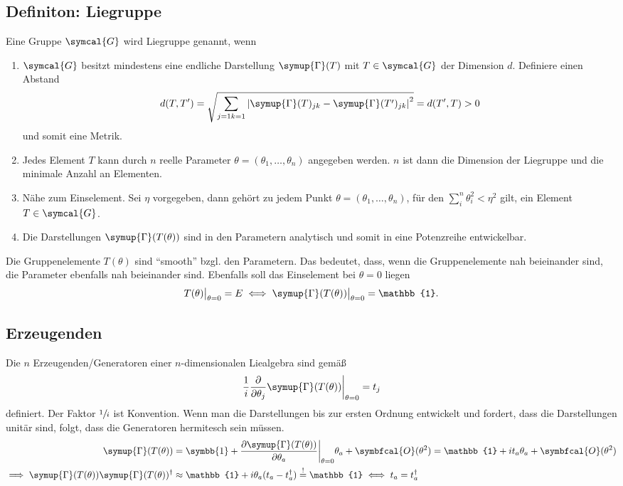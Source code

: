 \documentclass[
  captions=tableheading,  %
  titlepage=firstiscover, %
]{scrartcl}
\begin{document}
\subsection{Definiton: Liegruppe}
Eine Gruppe $\symcal{G}$ wird Liegruppe genannt, wenn
\begin{enumerate}
  \item $\symcal{G}$ besitzt mindestens eine endliche Darstellung $\symup{\Gamma}(T)$ mit $T \in \symcal{G}$ der Dimension 
  $d$. 
  Definiere einen Abstand 
    \begin{equation*}
      d(T,T') = \sqrt{\sum_{\substack{j=1}{k=1}} \left | \symup{\Gamma}(T)_{jk} - \symup{\Gamma}(T')_{jk} \right |^2  } = d(T',T) > 0
    \end{equation*}
    und somit eine Metrik.
  \item Jedes Element $T$ kann durch $n$ reelle Parameter $\theta = (\theta_1, \ldots, \theta_n)$ angegeben werden.
    $n$ ist dann die Dimension der Liegruppe und die minimale Anzahl an Elementen.
  \item Nähe zum Einselement. Sei $\eta$ vorgegeben, dann gehört zu jedem Punkt $\theta =  (\theta_1, \ldots, \theta_n)$,
    für den $\sum_i^n \theta_i^2 < \eta^2$ gilt, ein Element $T \in \symcal{G}$.
  \item Die Darstellungen $\symup{\Gamma}(T(\theta))$ sind in den Parametern analytisch und somit in eine Potenzreihe entwickelbar.
\end{enumerate}
Die Gruppenelemente $T(\theta)$ sind \enquote{smooth} bzgl. den Parametern. 
Das bedeutet, dass, wenn die Gruppenelemente nah beieinander sind, die Parameter ebenfalls nah beieinander sind.
Ebenfalls soll das Einselement bei $\theta = 0$ liegen
\begin{equation*}
  T(\theta)\big |_{\theta = 0} = E \iff \symup{\Gamma}(T(\theta)) \big |_{\theta = 0} = \mathbb{1} .
\end{equation*}
\subsection{Erzeugenden}
Die $n$ Erzeugenden/Generatoren einer $n$-dimensionalen Liealgebra sind gemäß 
\begin{equation}
  \frac{1}{i} \frac{\partial}{\partial \theta_j} \symup{\Gamma}(T(\theta)) \biggr |_{\theta = 0} = t_j \label{eqn:gen}
\end{equation}
definiert. 
Der Faktor $\sfrac{1}{i}$ ist Konvention.
Wenn man die Darstellungen bis zur ersten Ordnung entwickelt und fordert, dass die Darstellungen 
unitär sind, folgt, dass die Generatoren hermitesch sein müssen. 
\begin{align*}
  \symup{\Gamma}(T(\theta)) &= \symbb{1} + \frac{\partial \symup{\Gamma}(T(\theta))}{\partial \theta_a} \biggr |_{\theta = 0} \theta_a + \symbfcal{O}(\theta^2) 
  = \mathbb{1} + i t_a \theta_a + \symbfcal{O}(\theta^2) \\
  \implies \symup{\Gamma}(T(\theta))\symup{\Gamma}(T(\theta))^{\dagger}  &\approx \mathbb{1} + i \theta_a (t_a - t_a^{\dagger}) \stackrel{!}{=} \mathbb{1} \iff t_a = t_a^{\dagger}
\end{align*}
\end{document}
